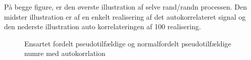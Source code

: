På begge figure, er den øverste illustration af selve rand/randn processen. Den midster illustration er af en enkelt realisering af det autokorrelateret signal og den nederste illustration auto korrelateringen  af 100 realisering.  
 \begin{figure}[!h]
	\centering
	\caption{ Ensartet fordelt pseudotilfældige og normalfordelt pseudotilfældige numre med autokorrlation }
	\label{fig:part2_ran}
\end{figure}

